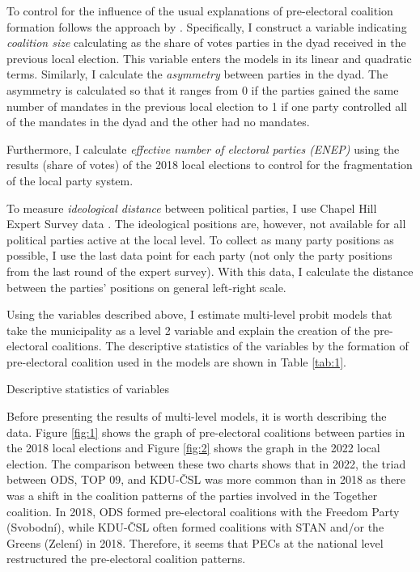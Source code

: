 \documentclass[]{interact}
\theoremstyle{plain}%
\theoremstyle{definition}
\theoremstyle{remark}
\begin{document}
To control for the influence of the usual explanations of pre-electoral coalition formation follows the approach by \citet{golder2006}. Specifically, I construct a variable indicating \emph{coalition size} calculating as the share of votes parties in the dyad received in the previous local election. This variable enters the models in its linear and quadratic terms.
Similarly, I calculate the \emph{asymmetry} between parties in the dyad. The asymmetry is calculated so that it ranges from 0 if the parties gained the same number of mandates in the previous local election to 1 if one party controlled all of the mandates in the dyad and the other had no mandates.

Furthermore, I calculate \emph{effective number of electoral parties (ENEP)} using the results (share of votes) of the 2018 local elections to control for the fragmentation of the local party system. 

To measure \emph{ideological distance} between political parties, I use Chapel Hill Expert Survey data \citep{jolly2022}. The ideological positions are, however, not available for all political parties active at the local level. To collect as many party positions as possible, I use the last data point for each party (not only the party positions from the last round of the expert survey). With this data, I calculate the distance between the parties' positions on general left-right scale. 


Using the variables described above, I estimate multi-level probit models that take the municipality as a level 2 variable and explain the creation of the pre-electoral coalitions. The descriptive statistics of the variables by the formation of pre-electoral coalition used in the models are shown in Table \ref{tab:1}.

\begin{table}
\let\center\empty
\let\endcenter\relax
\centering
\caption{Descriptive statistics of variables \label{tab:1}}
{}
\end{table}

Before presenting the results of multi-level models, it is worth describing the data. Figure \ref{fig:1} shows the graph of pre-electoral coalitions between parties in the 2018 local elections and Figure \ref{fig:2} shows the graph in the 2022 local election. The comparison between these two charts shows that in 2022, the triad between ODS, TOP 09, and KDU-ČSL was more common than in 2018 as there was a shift in the coalition patterns of the parties involved in the Together coalition. In 2018, ODS formed pre-electoral coalitions with the Freedom Party (Svobodní), while KDU-ČSL often formed coalitions with STAN and/or the Greens (Zelení) in 2018. Therefore, it seems that PECs at the national level restructured the pre-electoral coalition patterns.  
\end{document}
